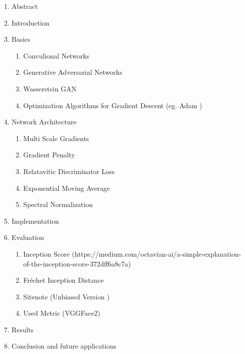 \documentclass[conference,onecolumn,compsoc]{IEEEtran}
\begin{document}
\noindent
\begin{enumerate}
  \item Abstract
  \item Introduction
  \item Basics
  \begin{enumerate}
    \item Convulional Networks 
    \item Generative Adversarial Networks \cite{goodfellow2014generative}
    \item Wasserstein GAN \cite{arjovsky2017wasserstein}
    \item Optimization Algorithms for Gradient Descent (eg. Adam \cite{kingma2017adam})
  \end{enumerate}
  \item Network Architecture
  \begin{enumerate}
    \item Multi Scale Gradients \cite{karnewar2020msggan}
    \item Gradient Penalty \cite{arjovsky2017wasserstein,gulrajani2017improved}
    \item Relatavitic Discriminator Loss \cite{jolicoeurmartineau2018relativistic}
    \item Exponential Moving Average \cite{yazıcı2019unusual}
    \item Spectral Normalization \cite{miyato2018spectral}
  \end{enumerate}
  \item Implementation
  \item Evaluation
  \begin{enumerate}
    \item Inception Score \cite{salimans2016improved} (https://medium.com/octavian-ai/a-simple-explanation-of-the-inception-score-372dff6a8c7a)
    \item Fréchet Inception Distance \cite{heusel2018gans}
    \item Sitenote (Unbiased Version \cite{chong2020effectively})
    \item Used Metric (VGGFace2) \cite{cao2018vggface2}
  \end{enumerate}
  \item Results
  \item Conclusion and future applications
\end{enumerate}


\newpage


\printbibliography
\end{document}
